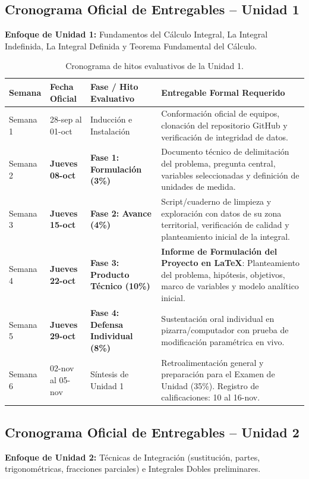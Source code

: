 \documentclass[11pt,a4paper]{article}
\begin{document}
\subsection{Cronograma Oficial de Entregables -- Unidad 1}
\textbf{Enfoque de Unidad 1:} Fundamentos del Cálculo Integral, La Integral Indefinida, La Integral Definida y Teorema Fundamental del Cálculo.

\begin{table}[h!]
\centering
\scriptsize
\renewcommand{\arraystretch}{1.12}
\begin{tabularx}{\textwidth}{C{1.3cm} C{2.4cm} L{3.4cm} Y}
\toprule
\textbf{Semana} & \textbf{Fecha Oficial} & \textbf{Fase / Hito Evaluativo} & \textbf{Entregable Formal Requerido} \\
\midrule
Semana 1 & 28-sep al 01-oct & Inducción e Instalación & Conformación oficial de equipos, clonación del repositorio GitHub y verificación de integridad de datos. \\
Semana 2 & \textbf{Jueves 08-oct} & \textbf{Fase 1: Formulación (3\%)} & Documento técnico de delimitación del problema, pregunta central, variables seleccionadas y definición de unidades de medida. \\
Semana 3 & \textbf{Jueves 15-oct} & \textbf{Fase 2: Avance (4\%)} & Script/cuaderno de limpieza y exploración con datos de su zona territorial, verificación de calidad y planteamiento inicial de la integral. \\
Semana 4 & \textbf{Jueves 22-oct} & \textbf{Fase 3: Producto Técnico (10\%)} & \textbf{Informe de Formulación del Proyecto en \LaTeX{}}: Planteamiento del problema, hipótesis, objetivos, marco de variables y modelo analítico inicial. \\
Semana 5 & \textbf{Jueves 29-oct} & \textbf{Fase 4: Defensa Individual (8\%)} & Sustentación oral individual en pizarra/computador con prueba de modificación paramétrica en vivo. \\
Semana 6 & 02-nov al 05-nov & Síntesis de Unidad 1 & Retroalimentación general y preparación para el Examen de Unidad (35\%). Registro de calificaciones: 10 al 16-nov. \\
\bottomrule
\end{tabularx}
\caption{Cronograma de hitos evaluativos de la Unidad 1.}
\end{table}

\subsection{Cronograma Oficial de Entregables -- Unidad 2}
\textbf{Enfoque de Unidad 2:} Técnicas de Integración (sustitución, partes, trigonométricas, fracciones parciales) e Integrales Dobles preliminares.
\end{document}
